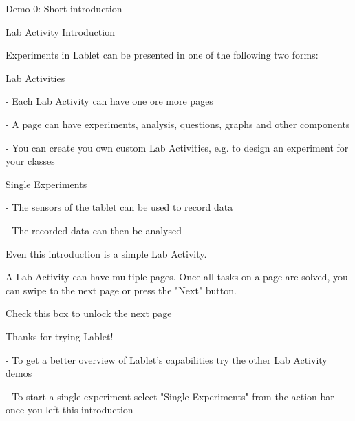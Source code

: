 {Demo 0: Short introduction}

{Lab Activity Introduction}

	Experiments in Lablet can be presented in one of the following two forms:

    Lab Activities

    - Each Lab Activity can have one ore more pages

    - A page can have experiments, analysis, questions, graphs and other components

    - You can create you own custom Lab Activities, e.g. to design an experiment for your classes

    Single Experiments

    - The sensors of the tablet can be used to record data

    - The recorded data can then be analysed

    Even this introduction is a simple Lab Activity.

    A Lab Activity can have multiple pages. Once all tasks on a page are solved, you can swipe to the next page or press the "Next" button.

	Check this box to unlock the next page

{Thanks for trying Lablet!}

	- To get a better overview of Lablet's capabilities try the other Lab Activity demos

	- To start a single experiment select "Single Experiments" from the action bar once you left this introduction

